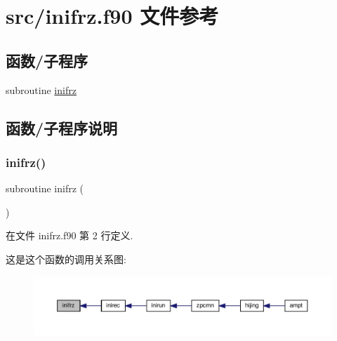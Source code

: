 \hypertarget{inifrz_8f90}{}\section{src/inifrz.f90 文件参考}
\label{inifrz_8f90}
\subsection*{函数/子程序}
\begin{DoxyCompactItemize}
\item 
subroutine \mbox{\hyperlink{inifrz_8f90_a7059be4c93d525c3e6271ba604174d5d}{inifrz}}
\end{DoxyCompactItemize}


\subsection{函数/子程序说明}
\mbox{\label{inifrz_8f90_a7059be4c93d525c3e6271ba604174d5d}} 
\subsubsection{\texorpdfstring{inifrz()}{inifrz()}}
{\footnotesize\ttfamily subroutine inifrz (\begin{DoxyParamCaption}{ }\end{DoxyParamCaption})}



在文件 inifrz.\+f90 第 2 行定义.

这是这个函数的调用关系图\+:
\nopagebreak
\begin{figure}[H]
\begin{center}
\leavevmode
\includegraphics[width=350pt]{inifrz_8f90_a7059be4c93d525c3e6271ba604174d5d_icgraph}
\end{center}
\end{figure}
